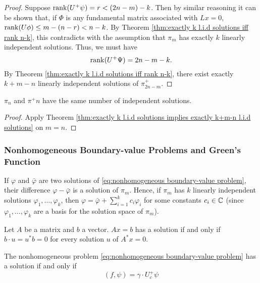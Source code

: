 \documentclass[10.5pt, oneside, a4paper]{article}
\begin{document}
\begin{proof}
    Suppose $\operatorname{rank}(U^+\psi)=r<(2n-m)-k$. Then by similar reasoning it can be shown that, if $\Phi$ is any fundamental matrix associated with $Lx=0$, $\operatorname{rank}(U\phi)\leq m - (n-r)<n-k$. By Theorem \ref{thm:exactly k l.i.d solutions iff rank n-k}, this contradicts with the assumption that $\pi_m$ has exactly $k$ linearly independent solutions. Thus, we must have
    \[\operatorname{rank}(U^+\Psi)=2n-m-k.\]
    By Theorem \ref{thm:exactly k l.i.d solutions iff rank n-k}, there exist exactly $k+m-n$ linearly independent solutions of $\pi_{2n-m}^+$.
\end{proof}

\begin{cor}
    $\pi_n$ and $\pi^+n$ have the same number of independent solutions.
\end{cor}
{\color{blue}
\begin{proof}
    Apply Theorem \ref{thm:exactly k l.i.d solutions implies exactly k+m-n l.i.d solutions} on $m=n$.
\end{proof}
}

\subsubsection{Nonhomogeneous Boundary-value Problems and Green's Function}
\begin{rmk}
    If $\varphi$ and $\bar{\varphi}$ are two solutions of \ref{eq:nonhomogeneous boundary-value problem}, their difference $\varphi-\bar{\varphi}$ is a solution of $\pi_m$. Hence, if $\pi_m$ has $k$ linearly independent solutions $\varphi_1,\ldots,\varphi_k$, then $\varphi=\bar{\varphi}+\sum_{i=1}^k c_i\varphi_i$ for some constants $c_i\in\mathbb C$ {\color{blue}(since $\varphi_1,\ldots,\varphi_k$ are a basis for the solution space of $\pi_m$)}.
\end{rmk}

\begin{prop}
    Let $A$ be a matrix and $b$ a vector. $Ax=b$ has a solution if and only if $b\cdot u=u^*b=0$ for every solution $u$ of $A^*x=0$.
\end{prop}

\begin{thm}\label{thm:nonhomogeneous problem has solution iff condition}
    The nonhomogeneous problem \ref{eq:nonhomogeneous boundary-value problem} has a solution if and only if
    \begin{equation}\label{eq:nonhomogeneous problem has solution iff condition}
        (f,\psi)=\gamma\cdot U_c^+\psi
    \end{equation}
\end{thm}
\end{document}
